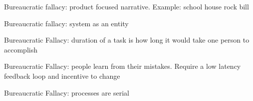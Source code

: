 Bureaucratic fallacy: product focused narrative. Example: school house rock bill

Bureaucratic fallacy: system as an entity

Bureaucratic Fallacy: duration of a task is how long it would take one person to accomplish

Bureaucratic Fallacy: people learn from their mistakes. Require a low latency feedback loop and incentive to change

Bureaucratic Fallacy: processes are serial